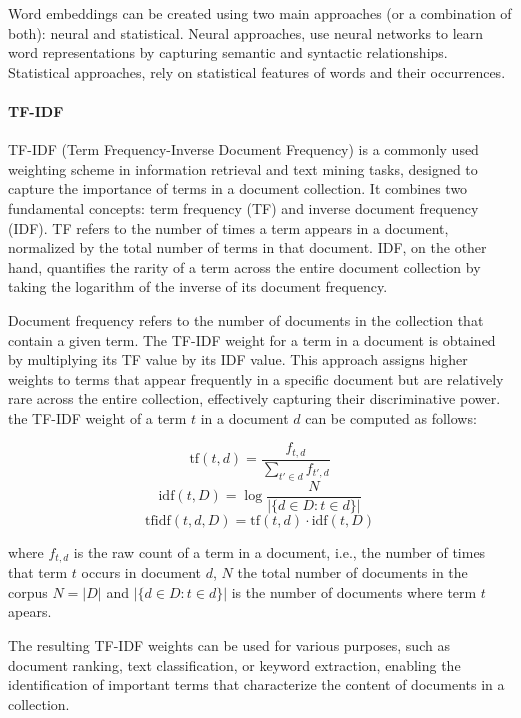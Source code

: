 \documentclass[a4paper,12pt]{article}
\begin{document}
Word embeddings can be created using two main approaches (or a combination of both): neural and statistical. 
Neural approaches, use neural networks to learn word representations by capturing semantic and syntactic relationships. Statistical approaches, rely on statistical features of words and their occurrences.

\paragraph{TF-IDF}
TF-IDF (Term Frequency-Inverse Document Frequency) is a commonly used weighting scheme in information retrieval and text mining tasks, designed to capture the importance of terms in a document collection. It combines two fundamental concepts: term frequency (TF) and inverse document frequency (IDF). TF refers to the number of times a term appears in a document, normalized by the total number of terms in that document. IDF, on the other hand, quantifies the rarity of a term across the entire document collection by taking the logarithm of the inverse of its document frequency. 

Document frequency refers to the number of documents in the collection that contain a given term. The TF-IDF weight for a term in a document is obtained by multiplying its TF value by its IDF value. This approach assigns higher weights to terms that appear frequently in a specific document but are relatively rare across the entire collection, effectively capturing their discriminative power. the TF-IDF weight of a term $t$ in a document $d$ can be computed as follows:

$${\displaystyle \mathrm {tf} (t,d)={\frac {f_{t,d}}{\sum _{t'\in d}{f_{t',d}}}}}$$
$$ \mathrm{idf}(t, D) =  \log \frac{N}{|\{d \in D: t \in d\}|}$$
$${\displaystyle \mathrm {tfidf} (t,d,D)=\mathrm {tf} (t,d)\cdot \mathrm {idf} (t,D)}$$


where $f_{t,d}$ is the raw count of a term in a document, i.e., the number of times that term $t$ occurs in document $d$,
$N$ the total number of documents in the corpus $N=|D|$ and  $|\{d \in D: t \in d\}|$ is the number of documents where term $t$ apears.

The resulting TF-IDF weights can be used for various purposes, such as document ranking, text classification, or keyword extraction, enabling the identification of important terms that characterize the content of documents in a collection.
\end{document}
